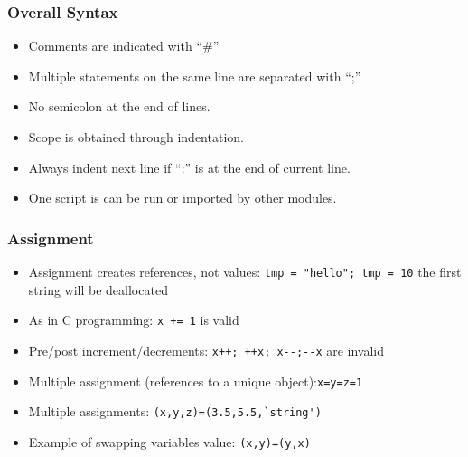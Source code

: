 \begin{frame}[fragile]  \frametitle{Overall Syntax}
\begin{itemize}
\item Comments are indicated with ``\#''
\item Multiple statements on the same line are separated with ``;''
\item No semicolon at the end of lines.
\item Scope is obtained through indentation. 
\item Always indent next line if ``:'' is at the end of current line.
\item One script is can be run or imported by other modules.
\end{itemize}
\end{frame}


\begin{frame}[fragile]  \frametitle{Assignment}
\begin{itemize}
\item Assignment creates references, not values:
\lstinline{tmp = "hello"; tmp = 10}
the first string will be deallocated
\item As in C programming: \lstinline{x += 1} is valid
\item Pre/post increment/decrements: \lstinline{x++; ++x; x--;--x} are invalid
\item Multiple assignment (references to a unique object):\lstinline{x=y=z=1}
\item Multiple assignments: \lstinline{(x,y,z)=(3.5,5.5,`string')}
\item  Example of swapping variables value: \lstinline{(x,y)=(y,x)}
\end{itemize}
\end{frame}



